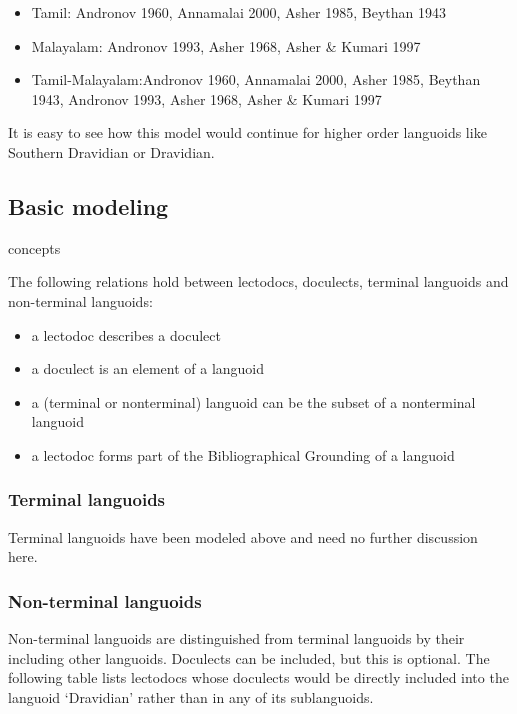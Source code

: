 \documentclass[a4paper,10pt]{article}
\begin{document}
\begin{itemize}
 \item Tamil: Andronov 1960, Annamalai 2000, Asher 1985, Beythan 1943
 \item Malayalam: Andronov 1993, Asher 1968, Asher \& Kumari 1997
 \item Tamil-Malayalam:Andronov 1960, Annamalai 2000, Asher 1985, Beythan 1943, Andronov 1993, Asher 1968, Asher \& Kumari 1997
\end{itemize}

It is easy to see how this model would continue for higher order languoids like Southern Dravidian or Dravidian.

\subsection{Basic modeling}

concepts

The following relations hold between lectodocs, doculects, terminal languoids and non-terminal languoids:
\begin{itemize}
 \item a lectodoc describes a doculect
 \item a doculect is an element of a languoid
 \item a (terminal or nonterminal) languoid can be the subset of a nonterminal languoid
 \item a lectodoc forms part of the Bibliographical Grounding of a languoid
\end{itemize}

\subsubsection{Terminal languoids}
Terminal languoids have been modeled above and need no further discussion here.

\subsubsection{Non-terminal languoids}
Non-terminal languoids are distinguished from terminal languoids by their including other languoids. Doculects can be included, but this is optional. The following table lists lectodocs whose doculects would be directly included into the languoid `Dravidian' rather than in any of its sublanguoids.
\end{document}

